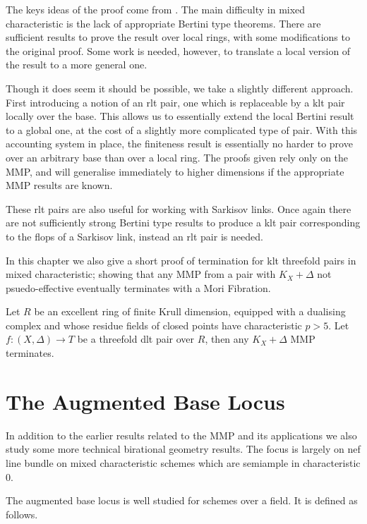 \documentclass[a4paper,12pt]{book}
\let \OldSection \section
\renewcommand{\section}[1]{\OldSection{#1} \thispagestyle{section}}
\begin{document}
	The keys ideas of the proof come from \cite{BCHM10}. The main difficulty in mixed characteristic is the lack of appropriate Bertini type theorems. There are sufficient results to prove the result over local rings, with some modifications to the original proof. Some work is needed, however, to translate a local version of the result to a more general one. 
	
	Though it does seem it should be possible, we take a slightly different approach. First introducing a notion of an rlt pair, one which is replaceable by a klt pair locally over the base. This allows us to essentially extend the local Bertini result to a global one, at the cost of a slightly more complicated type of pair. With this accounting system in place, the finiteness result is essentially no harder to prove over an arbitrary base than over a local ring. The proofs given rely only on the MMP, and will generalise immediately to higher dimensions if the appropriate MMP results are known. 
	
	These rlt pairs are also useful for working with Sarkisov links. Once again there are not sufficiently strong Bertini type results to produce a klt pair corresponding to the flops of a Sarkisov link, instead an rlt pair is needed.
	
	In this chapter we also give a short proof of termination for klt threefold pairs in mixed characteristic; showing that any MMP from a pair with $K_{X}+\Delta$ not psuedo-effective eventually terminates with a Mori Fibration.
	
	\begin{theo}
		Let $R$ be an excellent ring of finite Krull dimension, equipped with a dualising complex and whose residue fields of closed points have characteristic $p>5$.
		Let $f:(X,\Delta) \to T$ be a threefold dlt pair over $R$, then any $K_{X}+\Delta$ MMP terminates.
	\end{theo}
	
	\section{The Augmented Base Locus}
	
	In addition to the earlier results related to the MMP and its applications we also study some more technical birational geometry results. The focus is largely on nef line bundle on mixed characteristic schemes which are semiample in characteristic $0$.
	
	The augmented base locus is well studied for schemes over a field. It is defined as follows.
	
\end{document}
